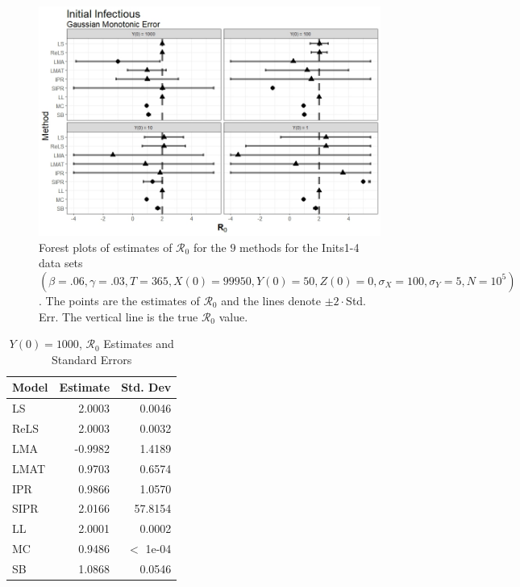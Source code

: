 \documentclass[12pt]{article}
\newcommand{\xxsir}{\ensuremath{9} } %
\newcommand{\rr}{\ensuremath{\mathcal{R}_0}}
\begin{document}
\begin{figure}[H]
	\centering
	\includegraphics[scale=0.5]{images/start_nm.jpeg}
	\caption{Forest plots of estimates of $\rr$ for the \xxsir methods for the Inits1-4 data sets $(\beta=.06, \gamma=.03, T=365, X(0)=99950, Y(0)=50, Z(0)=0, \sigma_X=100, \sigma_Y=5, N=10^5)$.  The points are the estimates of $\rr$ and the lines denote $\pm 2\cdot $Std. Err.  The vertical line is the true $\rr$ value.}
\end{figure}


\begin{table}[H]
	
	\centering
	\begin{tabular}[t]{l|r|r}
		\hline
		Model & Estimate & Std. Dev\\
		\hline
		LS & 2.0003 & 0.0046\\
		\hline
		ReLS & 2.0003 & 0.0032\\
		\hline
		LMA & -0.9982 & 1.4189\\
		\hline
		LMAT & 0.9703 & 0.6574\\
		\hline
		IPR & 0.9866 & 1.0570\\
		\hline
		SIPR & 2.0166 & 57.8154\\
		\hline
		LL & 2.0001 & 0.0002\\
		\hline
		MC & 0.9486 & $<$ 1e-04\\
		\hline
		SB & 1.0868 & 0.0546\\
		\hline
	\end{tabular}
	\caption{$Y(0) = 1000$, $\rr$ Estimates and Standard Errors}
\end{table}
\end{document}
